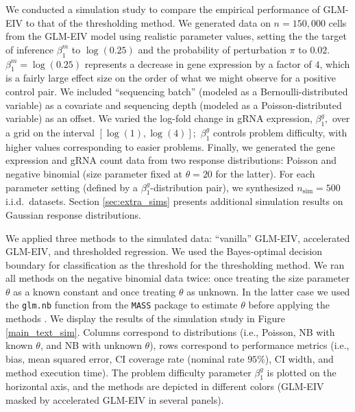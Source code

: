 \documentclass[11pt]{article}
\begin{document}
We conducted a simulation study to compare the empirical performance of GLM-EIV to that of the thresholding method. We generated data on $n = 150,000$ cells from the GLM-EIV model using realistic parameter values, setting the the target of inference $\beta^m_1$ to $\log(0.25)$ and the probability of perturbation $\pi$ to $0.02$. $\beta^m_1 = \log(0.25)$ represents a decrease in gene expression by a factor of $4$, which is a fairly large effect size on the order of what we might observe for a positive control pair. We included ``sequencing batch'' (modeled as a Bernoulli-distributed variable) as a covariate and sequencing depth (modeled as a Poisson-distributed variable) as an offset. We varied the log-fold change in gRNA expression, $\beta^g_1,$ over a grid on the interval $[\log(1), \log(4)];$ $\beta^g_1$ controls problem difficulty, with higher values corresponding to easier problems. Finally, we generated the gene expression and gRNA count data from two response distributions: Poisson and negative binomial (size parameter fixed at $\theta = 20$ for the latter). For each parameter setting (defined by a $\beta^g_1$-distribution pair), we synthesized $n_\textrm{sim} = 500$ i.i.d.\ datasets. Section \ref{sec:extra_sims} presents additional simulation results on Gaussian response distributions.

We applied three methods to the simulated data: ``vanilla'' GLM-EIV, accelerated GLM-EIV, and thresholded regression. We used the Bayes-optimal decision boundary for classification as the threshold for the thresholding method. We ran all methods on the negative binomial data twice: once treating the size parameter $\theta$ as a known constant and once treating $\theta$ as unknown. In the latter case we used the \texttt{glm.nb} function from the \texttt{MASS} package to estimate $\theta$ before applying the methods \cite{Ripley2013}. We display the results of the simulation study in Figure \ref{main_text_sim}. Columns correspond to distributions (i.e., Poisson, NB with known $\theta$, and NB with unknown $\theta$), rows correspond to performance metrics (i.e., bias, mean squared error, CI coverage rate (nominal rate $95\%$), CI width, and method execution time). The problem difficulty parameter $\beta^g_1$ is plotted on the horizontal axis, and the methods are depicted in different colors (GLM-EIV masked by accelerated GLM-EIV in several panels).
\end{document}
